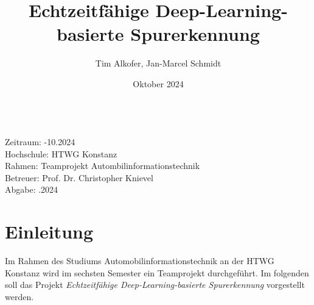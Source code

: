 \documentclass{article}
\title{Echtzeitfähige Deep-Learning-basierte Spurerkennung}
\author{Tim Alkofer, Jan-Marcel Schmidt}
\date{Oktober 2024} %
\begin{document}
    
    \maketitle
    
    \begin{tabbing}
    \hspace{5em} \= \\
        Zeitraum: -10.2024 \\ %
        Hochschule: \> HTWG Konstanz \\
        Rahmen: \> Teamprojekt Autombilinformationstechnik \\
        Betreuer: \> Prof. Dr. Christopher Knievel \\
        Abgabe: .2024 \\ %
    \end{tabbing}

    \clearpage
    \tableofcontents
    \clearpage
    \listoffigures
    \clearpage
    \printbibliography
    \clearpage

    \section{Einleitung}
        Im Rahmen des Studiums Automobilinformationstechnik an der HTWG Konstanz wird im sechsten Semester ein Teamprojekt durchgeführt.
        Im folgenden soll das Projekt \textit{Echtzeitfähige Deep-Learning-basierte Spurerkennung} vorgestellt werden.
\end{document}
